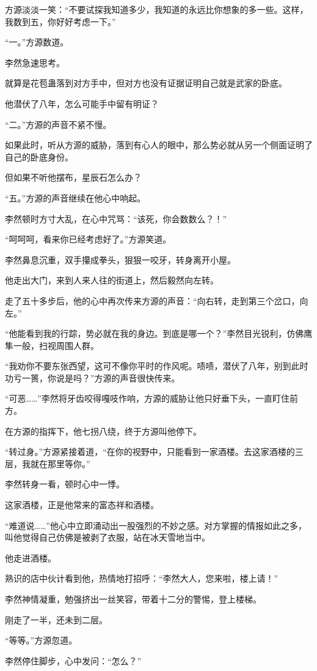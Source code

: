 \begin{this_body}
方源淡淡一笑：“不要试探我知道多少，我知道的永远比你想象的多一些。这样，我数到五，你好好考虑一下。”

“一。”方源数道。

李然急速思考。

就算是花苞蛊落到对方手中，但对方也没有证据证明自己就是武家的卧底。

他潜伏了八年，怎么可能手中留有明证？

“二。”方源的声音不紧不慢。

如果此时，听从方源的威胁，落到有心人的眼中，那么势必就从另一个侧面证明了自己的卧底身份。

但如果不听他摆布，星辰石怎么办？

“五。”方源的声音继续在他心中响起。

李然顿时方寸大乱，在心中咒骂：“该死，你会数数么？！”

“呵呵呵，看来你已经考虑好了。”方源笑道。

李然鼻息沉重，双手攥成拳头，狠狠一咬牙，转身离开小屋。

他走出大门，来到人来人往的街道上，然后毅然向左转。

走了五十多步后，他的心中再次传来方源的声音：“向右转，走到第三个岔口，向左。”

“他能看到我的行踪，势必就在我的身边。到底是哪一个？”李然目光锐利，仿佛鹰隼一般，扫视周围人群。

“我劝你不要东张西望，这可不像你平时的作风呢。啧啧，潜伏了八年，别到此时功亏一篑，你说是吗？”方源的声音很快传来。

“可恶……”李然将牙齿咬得嘎吱作响，方源的威胁让他只好垂下头，一直盯住前方。

在方源的指挥下，他七拐八绕，终于方源叫他停下。

“转过身。”方源紧接着道，“在你的视野中，只能看到一家酒楼。去这家酒楼的三层，我就在那里等你。”

李然转身一看，顿时心中一悸。

这家酒楼，正是他常来的富态祥和酒楼。

“难道说……”他心中立即涌动出一股强烈的不妙之感。对方掌握的情报如此之多，叫他觉得自己仿佛是被剥了衣服，站在冰天雪地当中。

他走进酒楼。

熟识的店中伙计看到他，热情地打招呼：“李然大人，您来啦，楼上请！”

李然神情凝重，勉强挤出一丝笑容，带着十二分的警惕，登上楼梯。

刚走了一半，还未到二层。

“等等。”方源忽道。

李然停住脚步，心中发问：“怎么？”


\end{this_body}
